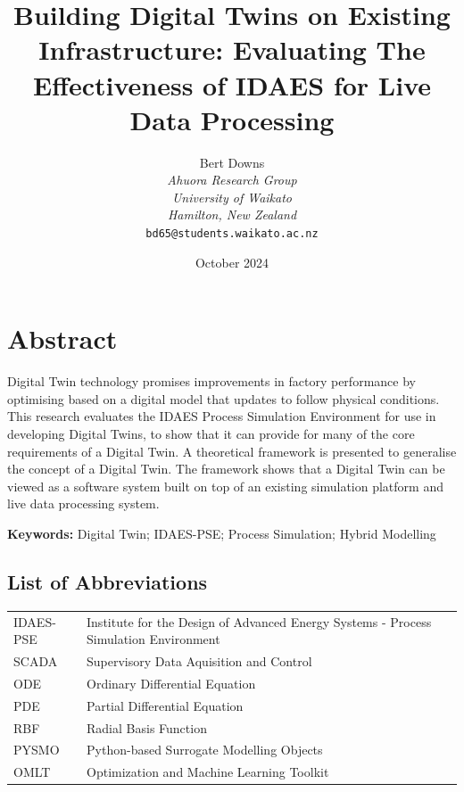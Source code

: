 \documentclass[12pt]{article}
\title{Building Digital Twins on Existing Infrastructure: Evaluating The Effectiveness of IDAES for Live Data Processing}
\author{Bert Downs\\
\textit{Ahuora Research Group}\\
\textit{University of Waikato}\\
\textit{Hamilton, New Zealand}\\
\texttt{bd65@students.waikato.ac.nz}}
\date{October 2024}
\begin{document}
\maketitle

\section*{Abstract}


Digital Twin technology promises improvements in factory performance by optimising based on a digital model that updates to follow physical conditions. This research evaluates the IDAES Process Simulation Environment for use in developing Digital Twins, to show that it can provide for many of the core requirements of a Digital Twin. A theoretical framework is presented to generalise the concept of a Digital Twin. The framework shows that a Digital Twin can be viewed as a software system built on top of an existing simulation platform and live data processing system. 



\begin{center}
\textbf{Keywords:} Digital Twin; IDAES-PSE; Process Simulation; Hybrid Modelling
\end{center}

\subsection*{List of Abbreviations}
\begin{tabular}{lL{13cm}}
    IDAES-PSE & Institute for the Design of Advanced Energy Systems - Process Simulation Environment \\
    SCADA & Supervisory Data Aquisition and Control \\
    ODE & Ordinary Differential Equation \\
    PDE & Partial Differential Equation \\
    RBF & Radial Basis Function \\
    PYSMO & Python-based Surrogate Modelling Objects \\
    OMLT & Optimization and Machine Learning Toolkit \\
\end{tabular}
\end{document}
